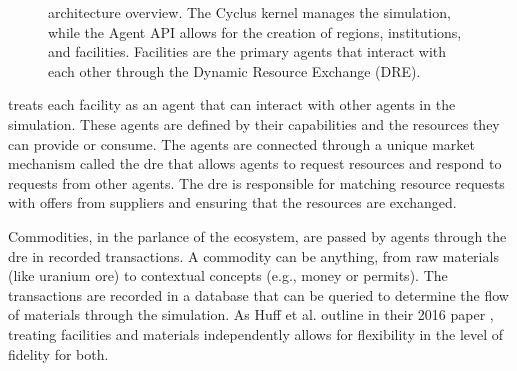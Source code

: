 \begin{figure}[H]
    \centering
    \caption{\cyclus architecture overview. The Cyclus kernel manages the simulation, while the Agent API allows for the creation of regions, institutions, and facilities. Facilities are the primary agents that interact with each other through the Dynamic Resource Exchange (DRE).}
    \label{fig:cyclus_architecture}
\end{figure}

\cyclus treats each facility as an agent that can interact with other agents in
the simulation. These agents are defined by their capabilities and the resources
they can provide or consume. The agents are connected through a unique market
mechanism called the \gls{dre} that allows agents to request
resources and respond to requests from other agents. The \gls{dre} is responsible for matching resource requests with offers from suppliers and ensuring that the resources are exchanged.

Commodities, in the parlance of the \cyclus ecosystem, are passed by agents through the \gls{dre} in recorded transactions. A commodity can be anything, from raw materials (like uranium ore) to contextual concepts (e.g., money or permits). The transactions are recorded in a database that can be queried to determine the flow of materials through the simulation. As Huff et al. outline in their 2016 paper \cite{huff_cyclus_intro_2016}, treating facilities and materials independently allows for flexibility in the level of fidelity for both.

